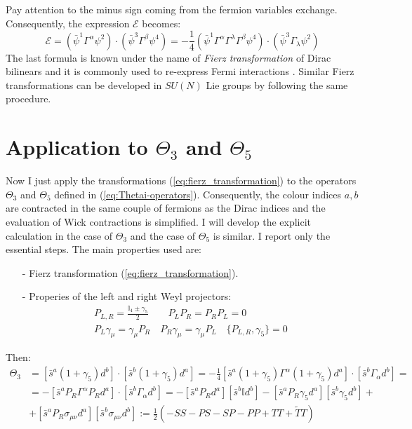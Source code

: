 \documentclass[english, LaM, oneside, noexaminfo]{sapthesis}
\begin{document}
Pay attention to the minus sign coming from the fermion variables exchange.
Consequently, the expression $\mathcal{E}$ becomes:
\begin{equation}\label{eq:fierz_transformation}
    \mathcal{E} = \left(\bar\psi^1 \Gamma^\alpha \psi^2 \right)\cdot\left(\bar\psi^3 \Gamma^\beta \psi^4 \right) = -\frac{1}{4} \left(\bar\psi^1 \Gamma^\alpha \Gamma^\lambda \Gamma^\beta \psi^4\right) \cdot \left(\bar\psi^3 \Gamma_\lambda \psi^2 \right)
\end{equation}
The last formula is known under the name of \textit{Fierz transformation} of Dirac bilinears and it is commonly used to re-express Fermi interactions \cite{Itzykson-Zuber}.
Similar Fierz transformations can be developed in $SU(N)$ Lie groups by following the same procedure.

\section{Application to $\Theta_3$ and $\Theta_5$}
\noindent
Now I just apply the transformations (\ref{eq:fierz_transformation}) to the operators $\Theta_3$ and $\Theta_5$ defined in (\ref{eq:Thetai-operators}).
Consequently, the colour indices $a,b$ are contracted in the same couple of fermions as the Dirac indices and the evaluation of Wick contractions is simplified.
I will develop the explicit calculation in the case of $\Theta_3$ and the case of $\Theta_5$ is similar.
\newline
I report only the essential steps. The main properties used are:
\begin{itemize}
    \item [-] Fierz transformation (\ref{eq:fierz_transformation}).
    \item [-] Properies of the left and right Weyl projectors:
        \begin{equation*}
            \begin{gathered}
                P_{L,R} = \frac{\mathbb{I}_4 \pm \gamma_5}{2} \qquad P_L P_R = P_R P_L = 0 \\
                P_L \gamma_\mu = \gamma_\mu P_R \quad P_R \gamma_\mu = \gamma_\mu P_L \quad \{ P_{L,R},\gamma_5 \} = 0
             \end{gathered}
        \end{equation*}
\end{itemize}
Then:
\begin{equation*}
    \begin{aligned}
        \Theta_3 
        & = [\bar s^a  (1+\gamma_5) d^b ] \cdot [ \bar s^b (1+\gamma_5) d^a ] = -\frac{1}{4}[\bar s^a  (1+\gamma_5) \Gamma^\alpha (1+\gamma_5) d^a ] \cdot [ \bar s^b \Gamma_\alpha d^b ] = \\
        & = - [\bar s^a P_R \Gamma^\alpha P_R d^a ] \cdot [ \bar s^b \Gamma_\alpha d^b ] =  - [\bar s^a P_R d^a ][ \bar s^b \mathbb{I} d^b ] - [\bar s^a P_R \gamma_5 d^a ][ \bar s^b \gamma_5 d^b ] + \\
        & + [\bar s^a P_R \sigma_{\mu\nu} d^a ][ \bar s^b \sigma_{\mu\nu} d^b ] := \frac{1}{2}\left(-SS-PS-SP-PP+TT+\tilde{T}T\right)\\
    \end{aligned}
\end{equation*}
\end{document}
